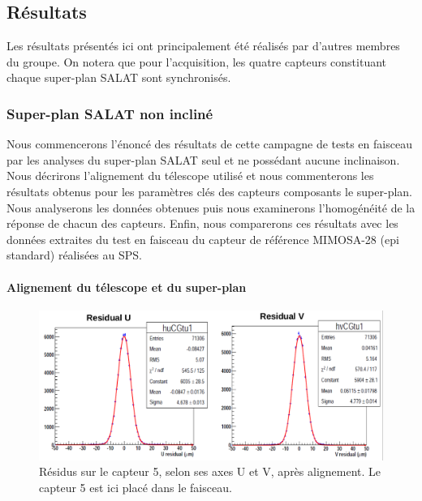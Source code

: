   
  \subsection{R\'esultats}
  
  Les r\'esultats pr\'esent\'es ici ont principalement \'et\'e r\'ealis\'es par d'autres membres du groupe. On notera que pour l'acquisition, les quatre capteurs constituant chaque super-plan SALAT sont synchronis\'es.
  
  \subsubsection{Super-plan SALAT non inclin\'e}

  Nous commencerons l'\'enonc\'e des r\'esultats de cette campagne de tests en faisceau par les analyses du super-plan SALAT seul et ne poss\'edant aucune inclinaison. Nous d\'ecrirons l'alignement du t\'elescope utilis\'e et nous commenterons les r\'esultats obtenus pour les param\`etres cl\'es des capteurs composants le super-plan. Nous analyserons les donn\'ees obtenues puis nous examinerons l'homog\'en\'eit\'e de la r\'eponse de chacun des capteurs. Enfin, nous comparerons ces r\'esultats avec les donn\'ees extraites du test en faisceau du capteur de r\'ef\'erence MIMOSA-28 (epi standard) r\'ealis\'ees au SPS.
  
  \paragraph{Alignement du t\'elescope et du super-plan}
  
   \begin{figure}[!htb]
    \begin{center} 
      \includegraphics[scale=0.375]{./figures/SALAT_beam_test/residus_thr6xNoise_sensor5.png}
      \caption{R\'esidus sur le capteur 5, selon ses axes U et V, apr\`es alignement. Le capteur 5 est ici plac\'e dans le faisceau.}
      \label{fig:SALAT_residus_sensor_5}
    \end{center}
   \end{figure}
  
